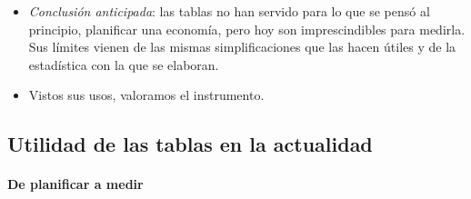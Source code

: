 \documentclass[11pt]{article}
\begin{document}
\begin{itemize}
\item \emph{Conclusión anticipada}: las tablas no han servido para lo que se pensó al principio, planificar una economía, pero hoy son imprescindibles para medirla. Sus límites vienen de las mismas simplificaciones que las hacen útiles y de la estadística con la que se elaboran.
\item Vistos sus usos, valoramos el instrumento.
\end{itemize}

\subsection{Utilidad de las tablas en la actualidad}\label{sec:utilidad}

\paragraph{De planificar a medir}
\end{document}
